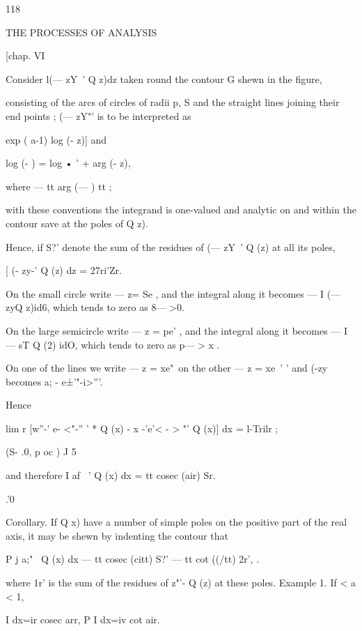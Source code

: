 118



THE PROCESSES OF ANALYSIS



[chap. VI



Consider l(— zY~' Q z)dz taken round the contour G shewn in the
figure,



consisting of the arcs of circles of radii p, S and the straight lines
joining their end points ; (— zY"' is to be interpreted as

exp ( a-1) log (- z)] and

log (- ) = log • ' + arg (- z),

where — tt arg (— ) tt ;

with these conventions the integrand is one-valued and analytic on and
within the contour save at the poles of Q z).

Hence, if S?' denote the sum of the residues of (— zY~' Q (z) at all
its poles,




[ (- zy-' Q (z) dz = 27ri'Zr.



On the small circle write — z= Se , and the integral along it becomes
— I (— zyQ z)id6, which tends to zero as 8— >0.



On the large semicircle write — z = pe' , and the integral along it
becomes — I — sT Q (2) idO, which tends to zero as p— > x .

On one of the lines we write — z = xe"\ on the other — z = xe~' ' and
(-zy~ becomes a; - e±'"-i>'''.

Hence

lim r [w''-' e- <"-'' ' * Q (x) - x -'e'< - > "' Q (x)] dx = l-Trilr ;

(S- .0, p oc ) J 5

and therefore I af ~' Q (x) dx = tt cosec (air) Sr.

.'0

Corollary. If Q x) have a number of simple poles on the positive part
of the real axis, it may be shewn by indenting the contour that

P j a;"~ Q (x) dx — tt cosec (citt) S?' — tt cot ((/tt) 2r', .

where 1r' is the sum of the residues of z"'- Q (z) at these poles.
Example 1. If < a < 1,

I dx=ir cosec arr, P I dx=iv cot air.


